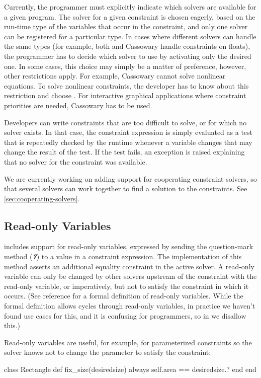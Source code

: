 Currently, the programmer must explicitly indicate which solvers are
available for a given program.  The solver for a given constraint is
chosen eagerly, based on the run-time type of the variables
that occur in the constraint, and only one solver can be registered
for a particular type. In cases where different solvers can handle the
same types (for example, both \zthree and Cassowary handle constraints
on floats), the programmer has to decide which solver to use by
activating only the desired one. In some cases, this choice may simply
be a matter of preference, however, other restrictions apply. For
example, Cassowary cannot solve nonlinear equations. To solve
nonlinear constraints, the developer has to know about this
restriction and choose \zthree. For interactive graphical applications
where constraint priorities are needed, Cassowary has to be used.

Developers can write constraints that are too
difficult to solve, or for which no solver exists. In that case, the
constraint expression is simply evaluated as a test that is repeatedly
checked by the runtime whenever a variable changes that may change the
result of the test. If the test fails, an exception is raised
explaining that no solver for the constraint was available.

We are currently working on adding support for cooperating constraint
solvers, so that several solvers can work together to find a solution
to the constraints.  See \autoref{sec:cooperating-solvers}.

\subsection{Read-only Variables}

\langname includes support for read-only variables, expressed by
sending the question-mark method ({\bfseries\emph{?}}) to a value in a
constraint expression. The implementation of this method asserts an
additional equality constraint in the active solver. A read-only
variable can only be changed by other solvers upstream of the
constraint with the read-only variable, or imperatively, but not to
satisfy the constraint in which it occurs. (See reference
\cite{borning-lisp-symbolic-computation-1992} for a formal definition
of read-only variables.  While the formal definition allows cycles
through read-only variables, in practice we haven't found use cases
for this, and it is confusing for programmers, so in \langname we
disallow this.)

Read-only variables are useful, for example, for parameterized
constraints so the solver knows not to change the parameter to satisfy
the constraint:
\begin{code}
class Rectangle
  def fix_size(desiredsize)
    always { self.area == desiredsize.? }
  end
end
\end{code}

